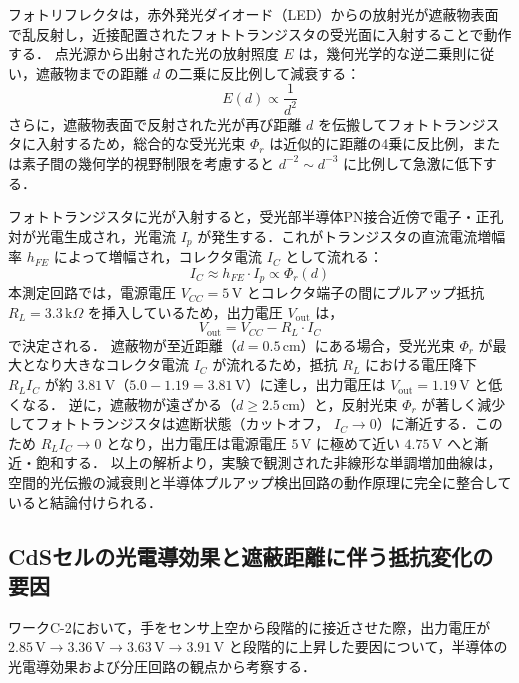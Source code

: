 フォトリフレクタは，赤外発光ダイオード（LED）からの放射光が遮蔽物表面で乱反射し，近接配置されたフォトトランジスタの受光面に入射することで動作する\cite{LBR-127HLD, 中村力1987ゲート蓄積型, wilson1998optoelectronics}．
点光源から出射された光の放射照度 $E$ は，幾何光学的な逆二乗則に従い\cite{iwasaki_point_method}，遮蔽物までの距離 $d$ の二乗に反比例して減衰する：
\begin{equation}
    E(d) \propto \frac{1}{d^2}
\end{equation}
さらに，遮蔽物表面で反射された光が再び距離 $d$ を伝搬してフォトトランジスタに入射するため，総合的な受光光束 $\Phi_r$ は近似的に距離の4乗に反比例，または素子間の幾何学的視野制限を考慮すると $d^{-2} \sim d^{-3}$ に比例して急激に低下する．

フォトトランジスタに光が入射すると，受光部半導体PN接合近傍で電子・正孔対が光電生成され，光電流 $I_p$ が発生する．これがトランジスタの直流電流増幅率 $h_{FE}$ によって増幅され，コレクタ電流 $I_C$ として流れる：
\begin{equation}
    I_C \approx h_{FE} \cdot I_p \propto \Phi_r(d)
\end{equation}
本測定回路では，電源電圧 $V_{CC} = 5\,\mathrm{V}$ とコレクタ端子の間にプルアップ抵抗 $R_L = 3.3\,\mathrm{k}\Omega$ を挿入しているため，出力電圧 $V_{\mathrm{out}}$ は，
\begin{equation}
    V_{\mathrm{out}} = V_{CC} - R_L \cdot I_C
    \label{eq:vout_pr}
\end{equation}
で決定される．
遮蔽物が至近距離（$d = 0.5\,\mathrm{cm}$）にある場合，受光光束 $\Phi_r$ が最大となり大きなコレクタ電流 $I_C$ が流れるため，抵抗 $R_L$ における電圧降下 $R_L I_C$ が約 $3.81\,\mathrm{V}$（$5.0 - 1.19 = 3.81\,\mathrm{V}$）に達し，出力電圧は $V_{\mathrm{out}} = 1.19\,\mathrm{V}$ と低くなる．
逆に，遮蔽物が遠ざかる（$d \ge 2.5\,\mathrm{cm}$）と，反射光束 $\Phi_r$ が著しく減少してフォトトランジスタは遮断状態（カットオフ， $I_C \to 0$）に漸近する．このため $R_L I_C \to 0$ となり，出力電圧は電源電圧 $5\,\mathrm{V}$ に極めて近い $4.75\,\mathrm{V}$ へと漸近・飽和する．
以上の解析より，実験で観測された非線形な単調増加曲線は，空間的光伝搬の減衰則と半導体プルアップ検出回路の動作原理に完全に整合していると結論付けられる．


\subsection{CdSセルの光電導効果と遮蔽距離に伴う抵抗変化の要因}
ワークC-2において，手をセンサ上空から段階的に接近させた際，出力電圧が $2.85\,\mathrm{V} \to 3.36\,\mathrm{V} \to 3.63\,\mathrm{V} \to 3.91\,\mathrm{V}$ と段階的に上昇した要因について，半導体の光電導効果および分圧回路の観点から考察する．

